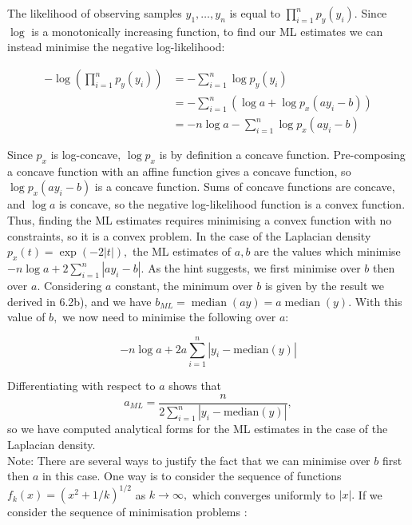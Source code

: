 \documentclass[a4paper,12pt]{article}
\begin{document}
The likelihood of observing samples $y_1,\ldots, y_n$ is equal to $\prod_{i=1}^n p_y(y_i).$ Since $\log$ is a monotonically increasing function, to find our ML estimates we can instead minimise the negative log-likelihood:

\begin{align*}
 -\log\left(\prod_{i=1}^n p_y(y_i)\right) &= -\sum_{i=1}^n \log p_y(y_i) \\
                                         &= -\sum_{i=1}^n  \left( \log a + \log p_x(ay_i-b) \right)\\
                                         &= -n\log a - \sum_{i=1}^n \log p_x(ay_i-b)
\end{align*}

Since $p_x$ is log-concave, $\log p_x$ is by definition a concave function. Pre-composing a concave function with an affine function gives a concave function, so $\log p_x(ay_i-b)$ is a concave function. Sums of concave functions are concave, and $\log a$ is concave, so the negative log-likelihood function is a convex function. Thus, finding the ML estimates requires minimising a convex function with no constraints, so it is a convex problem. In the case of the Laplacian density $p_x(t) = \exp(-2|t|),$ the ML estimates of $a,b$ are the values which minimise $-n\log a +2 \sum_{i=1}^n |ay_i-b|.$ As the hint suggests, we first minimise over $b$ then over $a.$ Considering $a$ constant, the minimum over $b$ is given by the result we derived in 6.2b), and we have $b_{ML} = \operatorname{median}(ay) = a\operatorname{median}(y).$ With this value of $b,$ we now need to minimise the following over $a:$

$$ - n \log a + 2a \sum_{i=1}^n | y_i - \text{median}(y)|$$

Differentiating with respect to $a$ shows that $$a_{ML} = \frac{n}{2 \sum_{i=1}^n |y_i - \text{median}(y)|},$$ so we have computed analytical forms for the ML estimates in the case of the Laplacian density. \\
\newline
Note: There are several ways to justify the fact that we can minimise over $b$ first then $a$ in this case. One way is to consider the sequence of functions $f_k(x) = (x^2+1/k)^{1/2}$ as $k\to\infty,$ which converges uniformly to $|x|.$ If we consider the sequence of minimisation problems :
\end{document}
